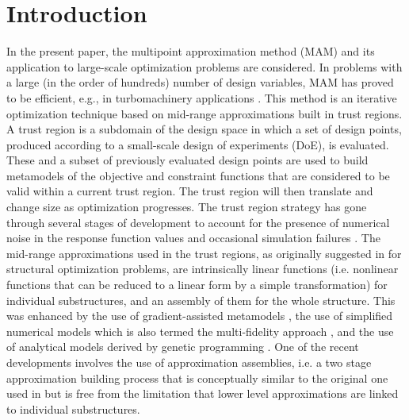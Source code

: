 \documentclass[runningheads,a4paper]{llncs}
\begin{document}
\section{Introduction}

In the present paper, the multipoint approximation method (MAM)
\cite{Toropov1989,Toropov1992,ToropovFilatov1993} and its application to
large-scale optimization problems are considered. In problems with a large (in
the order of hundreds) number of design variables, MAM has proved to be
efficient, e.g., in turbomachinery applications
\cite{ShahparPolynkinToropov2008,PolynkinToropovShahpar2008,PolynkinToropovShahpar2010}.
This method is an iterative optimization technique based on mid-range
approximations built in trust regions. A trust region is a subdomain of the
design space in which a set of design points, produced according to a
small-scale design of experiments (DoE), is evaluated. These and a subset of
previously evaluated design points are used to build metamodels of the
objective and constraint functions that are considered to be valid within a
current trust region. The trust region will then translate and change size as
optimization progresses. The trust region strategy has gone through several
stages of development to account for the presence of numerical noise in the
response function values
\cite{KeulenToropovMarkine1996,ToropovKeulenMarkine1996} and occasional
simulation failures \cite{ToropovMarkineHolden1999}. The mid-range
approximations used in the trust regions, as originally suggested in
\cite{Toropov1989} for structural optimization problems, are intrinsically
linear functions (i.e. nonlinear functions that can be reduced to a linear form
by a simple transformation) for individual substructures, and an assembly of them
for the whole structure. This was enhanced by the use of gradient-assisted
metamodels \cite{ToropovFilatov1993}, the use of simplified numerical models
which is also termed the multi-fidelity approach \cite{ToropovMarkine1996}, and
the use of analytical models derived by genetic programming
\cite{ToropovAlvarez1998}. One of the recent developments
\cite{PolynkinToropov2012} involves the use of approximation assemblies, i.e. a
two stage approximation building process that is conceptually similar to the
original one used in \cite{Toropov1989} but is free from the limitation that
lower level approximations are linked to individual substructures.
\end{document}
